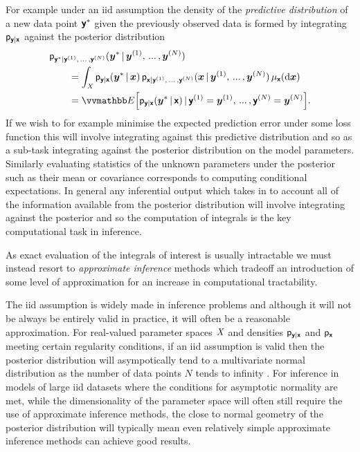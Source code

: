For example under an \ac{iid} assumption the density of the \emph{predictive distribution} of a new data point $\boldsymbol{\mathsf{y}}^*$ given the previously observed data is formed by integrating $\mathsf{p}_{\boldsymbol{\mathsf{y}}|\boldsymbol{\mathsf{x}}}$ against the posterior distribution
\begin{equation}\label{eq:iid-predictive-distribution}
\begin{split}
  &\pden{\rvct{y}^*|\rvct{y}^{(1)},\,...\,,\rvct{y}^{(N)}}(\vct{y}^* \gvn \vct{y}^{(1)},\,...\,,\vct{y}^{(N)}) \\
  &\qquad = 
  \int_{\set{X}} 
    \pden{\rvct{y}|\rvct{x}}(\vct{y}^*\gvn\vct{x})\,
    \pden{\rvct{x}|\rvct{y}^{(1)},\,...\,,\rvct{y}^{(N)}}(\vct{x} \gvn \vct{y}^{(1)},\,...\,,\vct{y}^{(N)})
  \,\mu_{\rvct{x}}(\dr \vct{x})
  \\
  & \qquad =
  \expc{\pden{\rvct{y}|\rvct{x}}(\vct{y}^*\gvn\rvct{x}) \gvn \rvct{y}^{(1)} = \vct{y}^{(1)},\,...\,,\rvct{y}^{(N)} = \vct{y}^{(N)}}.
\end{split}
\end{equation}
If we wish to for example minimise the expected prediction error under some loss function this will involve integrating against this predictive distribution and so as a sub-task integrating against the posterior distribution on the model parameters. Similarly evaluating statistics of the unknown parameters under the posterior such as their mean or covariance corresponds to computing conditional expectations. In general any inferential output which takes in to account all of the information available from the posterior distribution will involve integrating against the posterior and so the computation of integrals is the key computational task in inference.

As exact evaluation of the integrals of interest is usually intractable we must instead resort to \emph{approximate inference} methods which tradeoff an introduction of some level of approximation for an increase in computational tractability. %

The \ac{iid} assumption is widely made in inference problems and although it will not be always be entirely valid in practice, it will often be a reasonable approximation. For real-valued parameter spaces $\mathit{X}$ and densities $\mathsf{p}_{\boldsymbol{\mathsf{y}}|\boldsymbol{\mathsf{x}}}$ and $\mathsf{p}_{\boldsymbol{\mathsf{x}}}$ meeting certain regularity conditions, if an \ac{iid} assumption is valid then the posterior distribution will asympotically tend to a multivariate normal distribution as the number of data points $N$ tends to infinity \citep{hartigan1983bayes}. For inference in models of large \ac{iid} datasets where the conditions for asymptotic normality are met, while the dimensionality of the parameter space will often still require the use of approximate inference methods, the close to normal geometry of the posterior distribution will typically mean even relatively simple approximate inference methods can achieve good results. %

